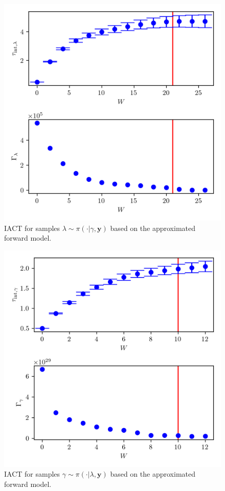 \begin{figure}[ht!]
	\centering
	\includegraphics{UwerrTauIntSecO3lam.png}
	\caption[IACT and autocorrelation function for samples $\lambda \sim \pi{\cdot | \gamma, \bm{y}}$.]{IACT for samples $\lambda \sim \pi( \cdot | \gamma, \bm{y})$ based on the approximated forward model.}
	\label{fig:IATCSecO3lam}
\end{figure}
\begin{figure}[ht!]
	\centering
	\includegraphics{UwerrTauIntSecO3gam.png}
	\caption[IACT and autocorrelation function for samples $\gamma \sim \pi( \cdot | \lambda, \bm{y})$]{IACT for samples $\gamma \sim \pi( \cdot | \lambda, \bm{y})$ based on the approximated forward model.}
	\label{fig:IATCSecO3gam}
\end{figure}
\clearpage
